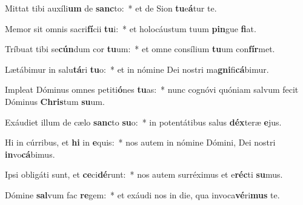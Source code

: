 \item Mittat tibi auxíli\textbf{um} de \textbf{sanc}to:~* et de Sion \textbf{tu}e\textbf{á}tur te.
\item Memor sit omnis sacri\textbf{fí}cii \textbf{tu}i:~* et holocáustum tuum \textbf{pin}gue \textbf{fi}at.
\item Tríbuat tibi se\textbf{cún}dum cor \textbf{tu}um:~* et omne consílium \textbf{tu}um con\textbf{fír}met.
\item Lætábimur in salu\textbf{tá}ri \textbf{tu}o:~* et in nómine Dei nostri ma\textbf{gni}fi\textbf{cá}bimur.
\item Impleat Dóminus omnes petiti\textbf{ó}nes \textbf{tu}as:~* nunc cognóvi quóniam salvum fecit Dóminus \textbf{Chris}tum \textbf{su}um.
\item Exáudiet illum de cælo \textbf{sanc}to \textbf{su}o:~* in potentátibus salus \textbf{déx}teræ \textbf{e}jus.
\item Hi in cúrribus, et \textbf{hi} in \textbf{e}quis:~* nos autem in nómine Dómini, Dei nostri \textbf{in}vo\textbf{cá}bimus.
\item Ipsi obligáti sunt, et \textbf{ce}ci\textbf{dé}runt:~* nos autem surréximus et e\textbf{réc}ti \textbf{su}mus.
\item Dómine \textbf{sal}vum fac \textbf{re}gem:~* et exáudi nos in die, qua invoca\textbf{vé}ri\textbf{mus} te.
